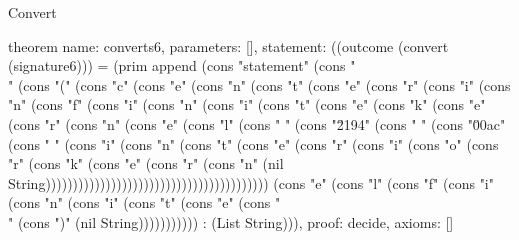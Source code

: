 \begin{lexlean}{Convert}
\begin{semanticmodule}
theorem{
  name: converts6,
  parameters: [],
  statement: ((outcome (convert (signature6))) = (prim append (cons "statement" (cons "\\" (cons "(" (cons "c" (cons "e" (cons "n" (cons "t" (cons "e" (cons "r" (cons "i" (cons "n" (cons "f" (cons "i" (cons "n" (cons "i" (cons "t" (cons "e" (cons "k" (cons "e" (cons "r" (cons "n" (cons "e" (cons "l" (cons " " (cons "\u2194" (cons " " (cons "\u00ac" (cons " " (cons "i" (cons "n" (cons "t" (cons "e" (cons "r" (cons "i" (cons "o" (cons "r" (cons "k" (cons "e" (cons "r" (cons "n" (nil String))))))))))))))))))))))))))))))))))))))))) (cons "e" (cons "l" (cons "f" (cons "i" (cons "n" (cons "i" (cons "t" (cons "e" (cons "\\" (cons ")" (nil String))))))))))) : (List String))),
  proof: decide{},
  axioms: []
}


\end{semanticmodule}
\end{lexlean}
